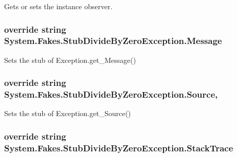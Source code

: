 Gets or sets the instance observer.

\hypertarget{class_system_1_1_fakes_1_1_stub_divide_by_zero_exception_af1a7beeb7990c34ca3740a9f0a28bab2}{
\subsubsection[{Message}]{\setlength{\rightskip}{0pt plus 5cm}override string System.\-Fakes.\-Stub\-Divide\-By\-Zero\-Exception.\-Message\hspace{0.3cm}{\ttfamily [get]}}}\label{class_system_1_1_fakes_1_1_stub_divide_by_zero_exception_af1a7beeb7990c34ca3740a9f0a28bab2}


Sets the stub of Exception.\-get\-\_\-\-Message()

\hypertarget{class_system_1_1_fakes_1_1_stub_divide_by_zero_exception_acf140598d6951ccd6384a33f2036eb25}{
\subsubsection[{Source}]{\setlength{\rightskip}{0pt plus 5cm}override string System.\-Fakes.\-Stub\-Divide\-By\-Zero\-Exception.\-Source\hspace{0.3cm}{\ttfamily [get]}, {\ttfamily [set]}}}\label{class_system_1_1_fakes_1_1_stub_divide_by_zero_exception_acf140598d6951ccd6384a33f2036eb25}


Sets the stub of Exception.\-get\-\_\-\-Source()

\hypertarget{class_system_1_1_fakes_1_1_stub_divide_by_zero_exception_a2a864aa4b642a143f0a7982f3814c31f}{
\subsubsection[{Stack\-Trace}]{\setlength{\rightskip}{0pt plus 5cm}override string System.\-Fakes.\-Stub\-Divide\-By\-Zero\-Exception.\-Stack\-Trace\hspace{0.3cm}{\ttfamily [get]}}}\label{class_system_1_1_fakes_1_1_stub_divide_by_zero_exception_a2a864aa4b642a143f0a7982f3814c31f}


